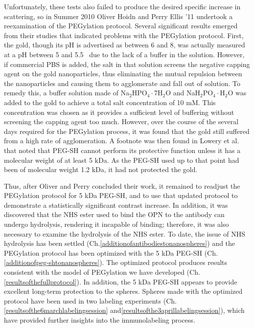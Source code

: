 Unfortunately, these tests also failed to produce the desired specific increase in scattering, so in Summer 2010 Oliver Hoidn and Perry Ellis '11 undertook a reexamination of the PEGylation protocol. Several significant results emerged from their studies that indicated problems with the PEGylation protocol. First, the gold, though its pH is advertised as between 6 and 8, was actually measured at a pH between 5 and 5.5~\citep{hoidnellis} due to the lack of a buffer in the solution. However, if commercial PBS is added, the salt in that solution screens the negative capping agent on the gold nanoparticles, thus eliminating the mutual repulsion between the nanoparticles and causing them to agglomerate and fall out of solution. To remedy this, a buffer solution made of Na$_2$HPO$_4\cdot$7H$_2$O and NaH$_2$PO$_4\cdot$H$_2$O was added to the gold to achieve a total salt concentration of 10 mM. This concentration was chosen as it provides a sufficient level of buffering without screening the capping agent too much. However, over the course of the several days required for the PEGylation process, it was found that the gold still suffered from a high rate of agglomeration. A footnote was then found in Lowery et al.~\citep{westpegylation} that noted that PEG-SH cannot perform its protective function unless it has a molecular weight of at least 5 kDa. As the PEG-SH used up to that point had been of molecular weight 1.2 kDa, it had not protected the gold.

Thus, after Oliver and Perry concluded their work, it remained to readjust the PEGylation protocol for 5 kDa PEG-SH, and to use that updated protocol to demonstrate a statistically significant contrast increase. In addition, it was discovered that the NHS ester used to bind the OPN to the antibody can undergo hydrolysis, rendering it incapable of binding; therefore, it was also necessary to examine the hydrolysis of the NHS ester. To date, the issue of NHS hydrolysis has been settled (Ch.\autoref{additionofantibodiestonanospheres}) and the PEGylation protocol has been optimized with the 5 kDa PEG-SH (Ch.\autoref{additionofpeg-shtonanospheres}). The optimized protocol produces results consistent with the model of PEGylation we have developed (Ch.\autoref{resultsofthefullprotocol}). In addition, the 5 kDa PEG-SH appears to provide excellent long-term protection to the spheres. Spheres made with the optimized protocol have been used in two labeling experiments (Ch.\autoref{resultsofthe6marchlabelingsession} and\autoref{resultsofthe3aprillabelingsession}), which have provided further insights into the immunolabeling process.
